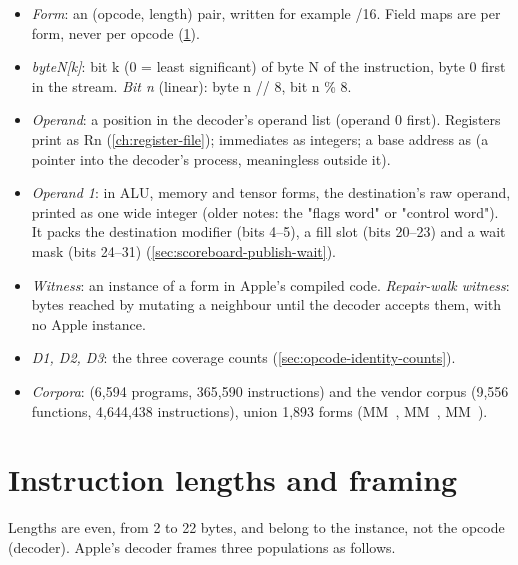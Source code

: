 \begin{itemize}
\item \emph{Form}: an (opcode, length) pair, written for example /16. Field maps are per form, never per opcode (\cref{sec:framing}).
\item \emph{byteN{[}k{]}}: bit k (0 = least significant) of byte N of the instruction, byte 0 first in the stream. \emph{Bit n} (linear):
  byte n // 8, bit n \% 8.
\item \emph{Operand}: a position in the decoder's operand list (operand 0 first). Registers print as Rn (\cref{ch:register-file}); immediates as
  integers; a base address as  (a pointer into the decoder's process, meaningless outside it).
\item \emph{Operand 1}: in ALU, memory and tensor forms, the destination's raw operand, printed as one wide integer (older notes:
  the "flags word" or "control word"). It packs the destination modifier (bits 4–5), a fill slot (bits 20–23) and a wait
  mask (bits 24–31) (\cref{sec:scoreboard-publish-wait}).
\item \emph{Witness}: an instance of a form in Apple's compiled code. \emph{Repair-walk witness}: bytes reached by mutating a
  neighbour until the decoder accepts them, with no Apple instance.
\item \emph{D1, D2, D3}: the three coverage counts (\cref{sec:opcode-identity-counts}).
\item \emph{Corpora}:  (6,594 programs, 365,590 instructions) and the vendor corpus (9,556
  functions, 4,644,438 instructions), union 1,893 forms (MM~, MM~, MM~).
\end{itemize}

\section{Instruction lengths and framing}\label{sec:framing}

Lengths are even, from 2 to 22 bytes, and belong to the instance, not the opcode (decoder). Apple's decoder frames
three populations as follows.

